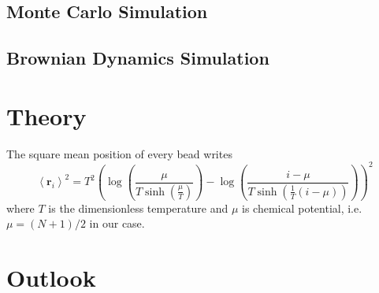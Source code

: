 \documentclass[12pt,a4paper]{article}
\begin{document}
\subsection{Monte Carlo Simulation}
\label{sub:monte_carlo_simulation}

\subsection{Brownian Dynamics Simulation}
\label{sub:brownian_dynamics_simulation}

\section{Theory}
\label{sec:theory}

The square mean position of every bead writes
\begin{equation}
	\left<\mathbf{r}_i\right>^2  = 
T^{2} \left(\log{\left (\frac{\mu}{T \sinh{\left (\frac{\mu}{T} \right )}} \right )} - \log{\left (\frac{i - \mu}{T \sinh{\left (\frac{1}{T} \left(i - \mu\right) \right )}} \right )}\right)^{2}
\end{equation}
where $T$ is the dimensionless temperature and $\mu$ is chemical potential, i.e.
$\mu = (N+1)/2$ in our case.

\section{Outlook}
\label{sec:outlook}




\end{document}
